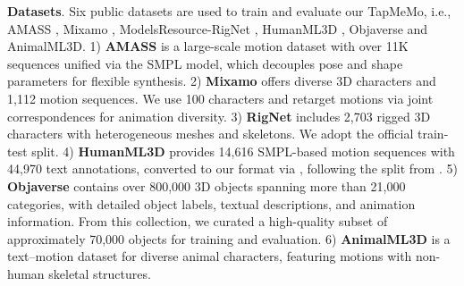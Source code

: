 \documentclass[lettersize,journal]{IEEEtran}
\newcommand{\blu}[1]{\texorpdfstring{{\leavevmode\color{blue}#1}}{#1}}
\begin{document}
\textbf{Datasets}. \blu{Six} public datasets are used to train and evaluate our TapMeMo, i.e., AMASS \cite{mahmood2019amass}, Mixamo \cite{mixamo}, ModelsResource-RigNet \cite{xu2019predicting},  HumanML3D \cite{guo2022generating}, \blu{Objaverse\cite{deitke2023objaverse} and AnimalML3D\cite{yang2024omnimotiongpt}.
1)} \textbf{AMASS} \cite{mahmood2019amass} is a large-scale motion dataset with over 11K sequences unified via the SMPL model, which decouples pose and shape parameters for flexible synthesis.
\blu{2)} \textbf{Mixamo} \cite{mixamo} offers diverse 3D characters and 1,112 motion sequences. We use 100 characters and retarget motions via joint correspondences for animation diversity.
\blu{3)} \textbf{RigNet} \cite{xu2019predicting} includes 2,703 rigged 3D characters with heterogeneous meshes and skeletons. We adopt the official train-test split.
\blu{4)} \textbf{HumanML3D} \cite{guo2022generating} provides 14,616 SMPL-based motion sequences with 44,970 text annotations, converted to our format via \cite{besl1992method}, following the split from \cite{guo2020action2motion}.
\blu{5)} \textbf{Objaverse} \cite{deitke2023objaverse} contains over 800,000 3D objects spanning more than 21,000 categories, with detailed object labels, textual descriptions, and animation information. From this collection, we curated a high-quality subset of approximately 70,000 objects for training and evaluation.
\blu{6) \textbf{AnimalML3D}\cite{yang2024omnimotiongpt} is a text–motion dataset for diverse animal characters, featuring motions with non-human skeletal structures.}
\end{document}
